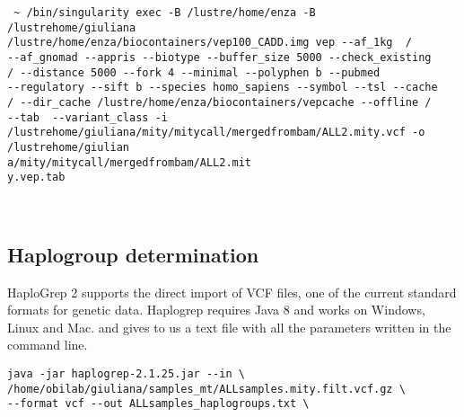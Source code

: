 \begin{verbatim} ~ /bin/singularity exec -B /lustre/home/enza -B   /lustrehome/giuliana
/lustre/home/enza/biocontainers/vep100_CADD.img vep --af_1kg  /
--af_gnomad --appris --biotype --buffer_size 5000 --check_existing
/ --distance 5000 --fork 4 --minimal --polyphen b --pubmed
--regulatory --sift b --species homo_sapiens --symbol --tsl --cache
/ --dir_cache /lustre/home/enza/biocontainers/vepcache --offline /
--tab  --variant_class -i
/lustrehome/giuliana/mity/mitycall/mergedfrombam/ALL2.mity.vcf -o /lustrehome/giulian
a/mity/mitycall/mergedfrombam/ALL2.mit
y.vep.tab 

\end{verbatim}\\


\subsection{Haplogroup determination}
HaploGrep 2 supports the direct import of VCF files, one of the current standard formats for genetic data.
Haplogrep requires Java 8 and works on Windows, Linux and Mac. and gives to us a text file with all the parameters written in the command line. \newline

\begin{verbatim} 
java -jar haplogrep-2.1.25.jar --in \
/home/obilab/giuliana/samples_mt/ALLsamples.mity.filt.vcf.gz \
--format vcf --out ALLsamples_haplogroups.txt \ \end{verbatim}
\\
\textbf{}

